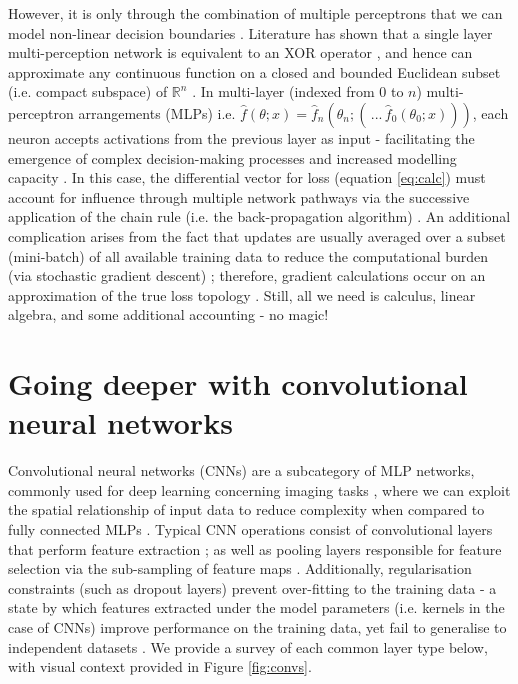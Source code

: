 However, it is only through the combination of multiple perceptrons that we can model non-linear decision boundaries \cite{Maier2019}. Literature has shown that a single layer multi-perception network is equivalent to an XOR operator \cite{Yanling}, and hence can approximate any continuous function on a closed and bounded Euclidean subset (i.e. compact subspace) of $\mathbb{R}^{n}$ \cite{Cybenko1989}. In multi-layer (indexed from $0$ to $n$) multi-perceptron arrangements (MLPs) i.e. $\hat{f}(\theta; x)= \hat{f}_{n}(\theta_{n};(\,... \,\hat{f}_{0}(\theta_{0}; x)))$, each neuron accepts activations from the previous layer as input - facilitating the emergence of complex decision-making processes and increased modelling capacity \cite{Maier2019}. In this case, the differential vector for loss (equation \ref{eq:calc}) must account for influence through multiple network pathways via the successive application of the chain rule (i.e. the back-propagation algorithm) \cite{Maier2019}. An additional complication arises from the fact that updates are usually averaged over a subset (mini-batch) of all available training data to reduce the computational burden (via stochastic gradient descent) \cite{Sun2019}; therefore, gradient calculations occur on an approximation of the true loss topology \cite{Sun2019}. Still, all we need is calculus, linear algebra, and some additional accounting - no magic!


\section{Going deeper with convolutional neural networks}
Convolutional neural networks (CNNs) are a subcategory of MLP networks, commonly used for deep learning concerning imaging tasks \cite{Maier2019}, where we can exploit the spatial relationship of input data to reduce complexity when compared to fully connected MLPs \cite{Lundervold2019}. Typical CNN operations consist of convolutional layers that perform feature extraction \cite{Hesamian2019}; as well as pooling layers responsible for feature selection via the sub-sampling of feature maps \cite{Ronneberger_2015}. Additionally, regularisation constraints (such as dropout layers) prevent over-fitting to the training data - a state by which features extracted under the model parameters (i.e. kernels in the case of CNNs) improve performance on the training data, yet fail to generalise to independent datasets \cite{Lundervold2019}. We provide a survey of each common layer type below, with visual context provided in Figure \ref{fig:convs}.

